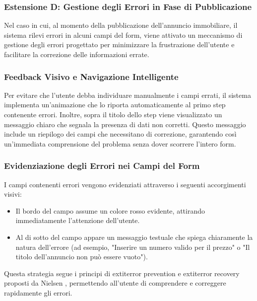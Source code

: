 \clearpage
\newpage
\subsubsection{Estensione D: Gestione degli Errori in Fase di Pubblicazione}

Nel caso in cui, al momento della pubblicazione dell'annuncio immobiliare, il sistema rilevi errori in alcuni campi del form, viene attivato un meccanismo di gestione degli errori progettato per minimizzare la frustrazione dell’utente e facilitare la correzione delle informazioni errate.

\newline
\subsubsection{Feedback Visivo e Navigazione Intelligente}
Per evitare che l’utente debba individuare manualmente i campi errati, il sistema implementa un’animazione che lo riporta automaticamente al primo step contenente errori. Inoltre, sopra il titolo dello step viene visualizzato un messaggio chiaro che segnala la presenza di dati non corretti. Questo messaggio include un riepilogo dei campi che necessitano di correzione, garantendo così un'immediata comprensione del problema senza dover scorrere l’intero form.

\subsubsection{Evidenziazione degli Errori nei Campi del Form}
I campi contenenti errori vengono evidenziati attraverso i seguenti accorgimenti visivi:
\begin{itemize}
    \item Il bordo del campo assume un colore rosso evidente, attirando immediatamente l’attenzione dell’utente.
    \item Al di sotto del campo appare un messaggio testuale che spiega chiaramente la natura dell’errore (ad esempio, "Inserire un numero valido per il prezzo" o "Il titolo dell’annuncio non può essere vuoto").
\end{itemize}

Questa strategia segue i principi di 	extit{error prevention} e 	extit{error recovery} proposti da Nielsen \cite{nielsen1995}, permettendo all’utente di comprendere e correggere rapidamente gli errori.

\newline
